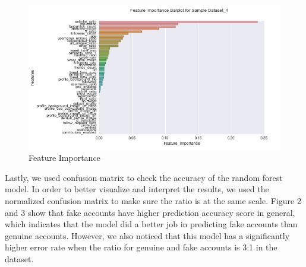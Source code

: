 \documentclass[a4paper, twoside, 12pt]{report}
\begin{document}
\begin{figure}[H]
	\centering
	\includegraphics[scale=0.7]{feature_4}
	\caption{Feature Importance}
	\label{fig:mesh1}
\end{figure}

\noindent Lastly, we used confusion matrix to check the accuracy of the random forest model. In order to better visualize and interpret the results, we used the normalized confusion matrix to make sure the ratio is at the same scale. Figure 2 and 3 show that fake accounts have higher prediction accuracy score in general, which indicates that the model did a better job in predicting fake accounts than genuine accounts. However, we also noticed that this model has a significantly higher error rate when the ratio for genuine and fake accounts is 3:1 in the dataset. 
\end{document}
